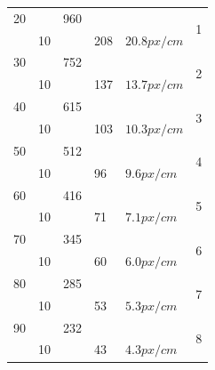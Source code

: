 \begin{appendix}
\begin{table}[h]
\begin{center}
\begin{tabular}[]{| l | l | l | l | l | l |}
                    \hline

                    20      &            & 960   &                &              & \multirow{2}{1cm}{1} \\
                            & 10         &       & 208            & $20.8 px/cm$ & \\
                    \hline

                    30      &            & 752   &                &              & \multirow{2}{1cm}{2} \\
                            & 10         &       & 137            & $13.7 px/cm$ & \\
                    \hline

                    40      &            & 615   &                &              & \multirow{2}{1cm}{3} \\
                            & 10         &       & 103            & $10.3 px/cm$ & \\
                    \hline

                    50      &            & 512   &                &              & \multirow{2}{1cm}{4} \\
                            & 10         &       & 96             & $9.6 px/cm$  & \\
                    \hline

                    60      &            & 416   &                &              & \multirow{2}{1cm}{5} \\
                            & 10         &       & 71             & $7.1 px/cm$  & \\
                    \hline

                    70      &            & 345   &                &              & \multirow{2}{1cm}{6} \\
                            & 10         &       & 60             & $6.0 px/cm$  & \\
                    \hline

                    80      &            & 285   &                &              & \multirow{2}{1cm}{7} \\
                            & 10         &       & 53             & $5.3 px/cm$  & \\
                    \hline

                    90      &            & 232   &                &              & \multirow{2}{1cm}{8} \\
                            & 10         &       & 43             & $4.3 px/cm$  & \\
                    \hline


\end{tabular}
\end{center}
\end{table}
\end{appendix}

